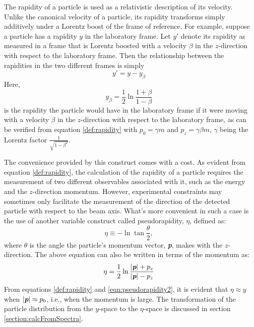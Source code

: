 The rapidity of a particle is used as a relativistic description of its velocity. Unlike the canonical velocity of a particle, its rapidity transforms simply additively under a Lorentz boost of the frame of reference. For example, suppose a particle has a rapidity $y$ in the laboratory frame. Let $y'$ denote its rapidity as measured in a frame that is Lorentz boosted with a velocity $\beta$ in the $z$-direction with respect to the laboratory frame. Then the relationship between the rapidities in the two different frames is simply
	\begin{equation}\label{eqn:rapidityTransformation}
	y' = y - y_{\beta}
	\end{equation}
Here,
	\begin{equation}
	y_{\beta} = \frac{1}{2}\ln{\frac{1 + \beta}{1 - \beta}}
	\end{equation}
is the rapidity the particle would have in the laboratory frame if it were moving with a velocity $\beta$ in the $z$-direction with respect to the laboratory frame, as can be verified from equation \ref{def:rapidity} with $p_{0} = \gamma m$ and $p_{z} = \gamma \beta m$, $\gamma$ being the Lorentz factor $\frac{1}{\sqrt{1 - \beta^2}}$.\cite{wong1994introduction}

The convenience provided by this construct comes with a cost. As evident from equation \ref{def:rapidity}, the calculation of the rapidity of a particle requires the measurement of two different observables associated with it, such as the energy and the $z$-direction momentum. However, experimental constraints may sometimes only facilitate the measurement of the direction of the detected particle with respect to the beam axis. What's more convenient in such a case is the use of another variable construct called pseudorapidity, $\eta$, defined as:
	\begin{equation}\label{def:pseudorapidity}
	\eta \equiv -\ln{\tan{\frac{\theta}{2}}},
	\end{equation}
where $\theta$ is the angle the particle's momentum vector, \textit{\textbf{p}}, makes with the $z$-direction. The above equation can also be written in terms of the momentum as:	
	\begin{equation}\label{eqn:pseudorapidity2}
	\eta = \frac{1}{2}\ln{\frac{\left|{\textit{\textbf{p}}}\right| + p_{z}}{\left|{\textit{\textbf{p}}}\right|- p_{z}}}
	\end{equation}
From equations \ref{def:rapidity} and \ref{eqn:pseudorapidity2}, it is evident that $\eta \approx y$ when $\left|{\textit{\textbf{p}}}\right| \approx p_{0}$, i.e., when the momentum is large. The transformation of the particle distribution from the $y$-space to the $\eta$-space is discussed in section \ref{section:calcFromSpectra}.
 
